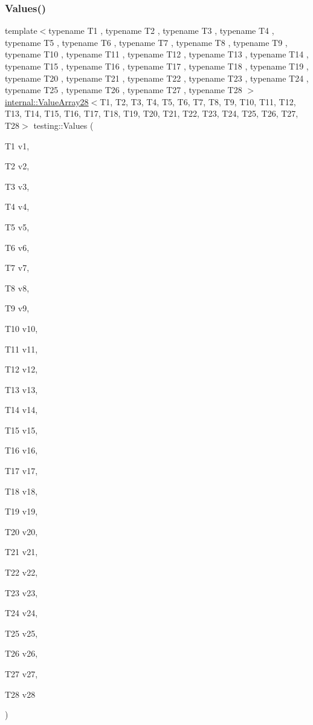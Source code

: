 \mbox{\label{namespacetesting_a5785254e0510108d9d422e32ba18f170}} 
\subsubsection{\texorpdfstring{Values()}{Values()}\hspace{0.1cm}{\footnotesize\ttfamily [28/50]}}
{\footnotesize\ttfamily template$<$typename T1 , typename T2 , typename T3 , typename T4 , typename T5 , typename T6 , typename T7 , typename T8 , typename T9 , typename T10 , typename T11 , typename T12 , typename T13 , typename T14 , typename T15 , typename T16 , typename T17 , typename T18 , typename T19 , typename T20 , typename T21 , typename T22 , typename T23 , typename T24 , typename T25 , typename T26 , typename T27 , typename T28 $>$ \\
\mbox{\hyperlink{classtesting_1_1internal_1_1ValueArray28}{internal\+::\+Value\+Array28}}$<$T1, T2, T3, T4, T5, T6, T7, T8, T9, T10, T11, T12, T13, T14, T15, T16, T17, T18, T19, T20, T21, T22, T23, T24, T25, T26, T27, T28$>$ testing\+::\+Values (\begin{DoxyParamCaption}\item[{T1}]{v1,  }\item[{T2}]{v2,  }\item[{T3}]{v3,  }\item[{T4}]{v4,  }\item[{T5}]{v5,  }\item[{T6}]{v6,  }\item[{T7}]{v7,  }\item[{T8}]{v8,  }\item[{T9}]{v9,  }\item[{T10}]{v10,  }\item[{T11}]{v11,  }\item[{T12}]{v12,  }\item[{T13}]{v13,  }\item[{T14}]{v14,  }\item[{T15}]{v15,  }\item[{T16}]{v16,  }\item[{T17}]{v17,  }\item[{T18}]{v18,  }\item[{T19}]{v19,  }\item[{T20}]{v20,  }\item[{T21}]{v21,  }\item[{T22}]{v22,  }\item[{T23}]{v23,  }\item[{T24}]{v24,  }\item[{T25}]{v25,  }\item[{T26}]{v26,  }\item[{T27}]{v27,  }\item[{T28}]{v28 }\end{DoxyParamCaption})}


